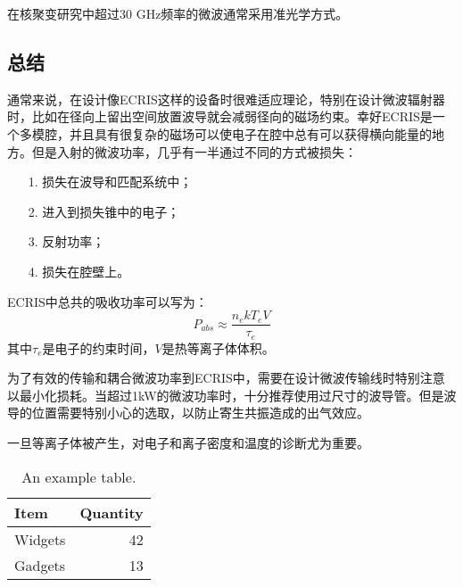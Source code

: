 \documentclass{article}
\begin{document}
在核聚变研究中超过30 GHz频率的微波通常采用准光学方式。

\subsection{总结}
通常来说，在设计像ECRIS这样的设备时很难适应理论，特别在设计微波辐射器时，比如在径向上留出空间放置波导就会减弱径向的磁场约束。幸好ECRIS是一个多模腔，并且具有很复杂的磁场可以使电子在腔中总有可以获得横向能量的地方。但是入射的微波功率，几乎有一半通过不同的方式被损失：
\begin{enumerate}
    \item [1.]损失在波导和匹配系统中；
    \item [2.]进入到损失锥中的电子；
    \item [3.]反射功率；
    \item [4.]损失在腔壁上。
\end{enumerate}

ECRIS中总共的吸收功率可以写为：
\begin{equation}
    P_{abs}\approx\frac{n_ekT_eV}{\tau_e}
\end{equation}
其中$\tau_e$是电子的约束时间，$V$是热等离子体体积。

为了有效的传输和耦合微波功率到ECRIS中，需要在设计微波传输线时特别注意以最小化损耗。当超过1kW的微波功率时，十分推荐使用过尺寸的波导管。但是波导的位置需要特别小心的选取，以防止寄生共振造成的出气效应。

一旦等离子体被产生，对电子和离子密度和温度的诊断尤为重要。



































\clearpage

\begin{table}
\centering
\begin{tabular}{l|r}
Item & Quantity \\\hline
Widgets & 42 \\
Gadgets & 13
\end{tabular}
\caption{\label{tab:widgets}An example table.}
\end{table}



\end{document}
